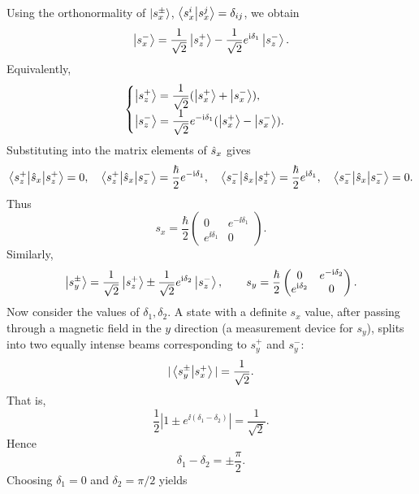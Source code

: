 Using the orthonormality of $\left|s_x^\pm\right\rangle$,
$\left\langle s_x^i\middle|s_x^j\right\rangle=\delta_{ij}$, we obtain
\begin{equation}
\left|s_x^-\right\rangle=\frac1{\sqrt2}\left|s_z^+\right\rangle-\frac1{\sqrt2}e^{\mathrm{i}\delta_1}\left|s_z^-\right\rangle.
\end{equation}
Equivalently,
\begin{equation}
\begin{cases}
\displaystyle\left|s_z^+\right\rangle=\frac1{\sqrt2}(\left|s_x^+\right\rangle+\left|s_x^-\right\rangle),\\[5pt]
\displaystyle\left|s_z^-\right\rangle=\frac1{\sqrt2}e^{-\mathrm{i}\delta_1}(\left|s_x^+\right\rangle-\left|s_x^-\right\rangle).
\end{cases}
\end{equation}
Substituting into the matrix elements of $\hat{s}_x$ gives
\begin{equation}
\left\langle s_z^+\middle|\hat{s}_x\middle|s_z^+\right\rangle=0,\quad
\left\langle s_z^+\middle|\hat{s}_x\middle|s_z^-\right\rangle=\frac\hbar2e^{-\mathrm{i}\delta_1},\quad
\left\langle s_z^-\middle|\hat{s}_x\middle|s_z^+\right\rangle=\frac\hbar2e^{\mathrm{i}\delta_1},\quad
\left\langle s_z^-\middle|\hat{s}_x\middle|s_z^-\right\rangle=0.
\end{equation}
Thus
\begin{equation}
s_x=\frac\hbar2\begin{pmatrix}0&e^{-\ii\delta_1}\\e^{\ii\delta_1}&0\end{pmatrix}.
\end{equation}
Similarly,
\begin{equation}
\left|s_y^\pm\right\rangle=\frac1{\sqrt2}\left|s_z^+\right\rangle\pm\frac1{\sqrt2}e^{\mathrm{i}\delta_2}\left|s_z^-\right\rangle,\qquad
s_y=\frac\hbar2\begin{pmatrix}0&e^{-\mathrm{i}\delta_2}\\e^{\mathrm{i}\delta_2}&0\end{pmatrix}.
\end{equation}
Now consider the values of $\delta_1,\delta_2$. A state with a definite $s_x$ value, after passing through a magnetic field in the $y$ direction (a measurement device for $s_y$), splits into two equally intense beams corresponding to $s_y^+$ and $s_y^-$:
\begin{equation}
|\left\langle s_y^\pm\middle|s_x^+\right\rangle|=\frac1{\sqrt2}.
\end{equation}
That is,
\begin{equation}
\frac12\left|1\pm e^{\ii(\delta_1-\delta_2)}\right|=\frac1{\sqrt2}.
\end{equation}
Hence
\begin{equation}
\delta_1-\delta_2=\pm\frac\pi2.
\end{equation}
Choosing $\delta_1=0$ and $\delta_2=\pi/2$ yields
